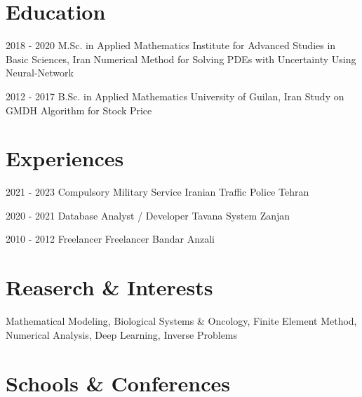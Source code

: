 \documentclass[10pt, a4paper]{article}
\begin{document}

	\section*{Education} 
		\eduEntry
		{2018 - 2020}
		{M.Sc. in Applied Mathematics}
		{Institute for Advanced Studies in Basic Sciences, Iran}
		{Numerical Method for Solving PDEs with Uncertainty Using Neural-Network}
		{ 
			 \\
		}
		
		\eduEntry
		{2012 - 2017}
		{B.Sc. in Applied Mathematics}
		{University of Guilan, Iran}
		{Study on GMDH Algorithm for Stock Price}
		{ 
		}
		
	\section*{Experiences}
	
		\expEntry
		{2021 - 2023}
		{Compulsory Military Service}
		{Iranian Traffic Police}
		{Tehran}{}
	
		\expEntry
		{2020 - 2021}
		{Database Analyst / Developer}
		{Tavana System}
		{Zanjan}
		{\textcolor{gray}{}}
		
		
		\expEntry
		{2010 - 2012}
		{Freelancer}
		{Freelancer}
		{Bandar Anzali}
		{\textcolor{gray}{}}

	\section*{Reaserch \& Interests}
	\interestslist
	{
		Mathematical Modeling,
		Biological Systems \& Oncology,
		Finite Element Method, 
		Numerical Analysis,
		Deep Learning,
		Inverse Problems
	}


	\section*{Schools \& Conferences}
		
\end{document}
